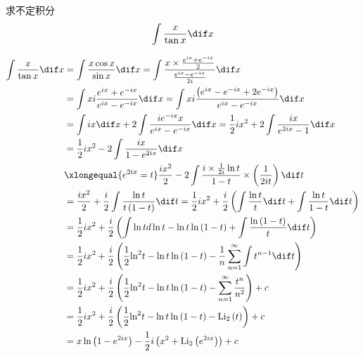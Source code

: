 \documentclass[color=green,titlestyle=hang]{elegantbook}%
\begin{document}
\begin{exercise}求不定积分\[\int {\frac{x}{{\tan x}}\dif x}\]
\end{exercise}\begin{Solution}\begin{align*}\int {\frac{x}{{\tan x}}\dif x}  &=\int {\frac{{x\cos x}}{{\sin x}}} \dif x = \int {\frac{{x \times \frac{{{e^{ix}} + {e^{ - ix}}}}{2}}}{{\frac{{{e^{ix}} - {e^{ - ix}}}}{{2i}}}}} \dif x \\
&= \int {xi\frac{{{e^{ix}} + {e^{ - ix}}}}{{{e^{ix}} - {e^{ - ix}}}}} \dif x = \int {xi\frac{{\left( {{e^{ix}} - {e^{ - ix}} + 2{e^{ - ix}}} \right)}}{{{e^{ix}} - {e^{ - ix}}}}} \dif x\\
&=\int {ix\dif x}  + 2\int {\frac{{i{e^{ - ix}}x}}{{{e^{ix}} - {e^{ - ix}}}}} \dif x = \frac{1}{2}i{x^2} + 2\int {\frac{{ix}}{{{e^{2ix}} - 1}}} \dif x \\
&= \frac{1}{2}i{x^2} - 2\int {\frac{{ix}}{{1 - {e^{2ix}}}}} \dif x\\
&\xlongequal{e^{2ix}= t}
\frac{{i{x^2}}}{2} - 2\int {\frac{{i \times \frac{1}{{2i}}\ln t}}{{1 - t}}}  \times \left( {\frac{1}{{2it}}} \right)\dif t \\
&= \frac{{i{x^2}}}{2} + \frac{i}{2}\int {\frac{{\ln t}}{{t\left( {1 - t} \right)}}} \dif t = \frac{1}{2}i{x^2} + \frac{i}{2}\left( {\int {\frac{{\ln t}}{t}} \dif t + \int {\frac{{\ln t}}{{1 - t}}} \dif t} \right)\\
& = \frac{1}{2}i{x^2} + \frac{i}{2}\left( {\int {\ln t} d\ln t - \ln t\ln \left( {1 - t} \right) + \int {\frac{{\ln \left( {1 - t} \right)}}{t}} \dif t} \right)\\
& = \frac{1}{2}i{x^2} + \frac{i}{2}\left( {\frac{1}{2}{{\ln }^2}t - \ln t\ln \left( {1 - t} \right) - \frac{{\rm{1}}}{n}\sum\limits_{n = 1}^\infty  {\int {{t^{n - 1}}} } \dif t} \right)\\
&=\frac{1}{2}i{x^2} + \frac{i}{2}\left( {\frac{1}{2}{{\ln }^2}t - \ln t\ln \left( {1 - t} \right) - \sum\limits_{n = 1}^\infty  {\frac{{{t^n}}}{{{n^2}}}} } \right) + c\\
&= \frac{1}{2}i{x^2} + \frac{i}{2}\left( {\frac{1}{2}{{\ln }^2}t - \ln t\ln \left( {1 - t} \right) -\mathrm{Li}_2\left( t \right)} \right) + c \\
&= x\ln \left( {1 - {e^{2ix}}} \right) - \frac{1}{2}i\left( {{x^2} +\mathrm{Li}_2\left( {{e^{2ix}}} \right)} \right) + c
\end{align*}
\end{Solution}
\end{document}
